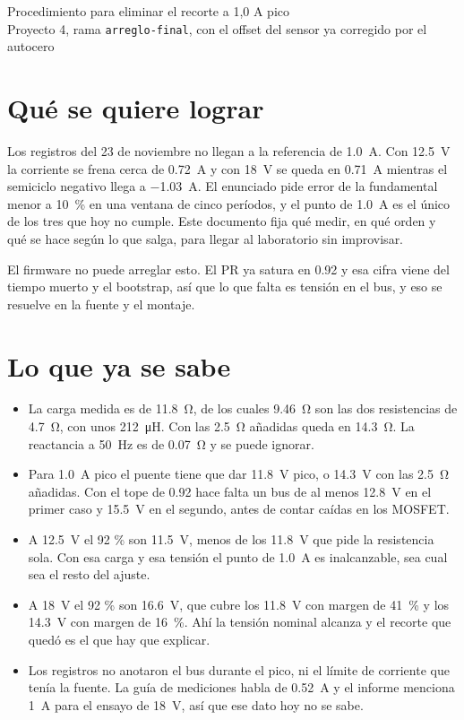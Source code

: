 \documentclass[11pt,a4paper]{article}
\begin{document}
\begin{center}
{\Large Procedimiento para eliminar el recorte a 1,0 A pico}\\[4pt]
Proyecto 4, rama \texttt{arreglo-final}, con el offset del sensor ya corregido por el autocero
\end{center}

\section{Qué se quiere lograr}

Los registros del 23 de noviembre no llegan a la referencia de \SI{1.0}{A}. Con \SI{12.5}{V} la corriente se frena cerca de \SI{+0.72}{A} y con \SI{18}{V} se queda en \SI{+0.71}{A} mientras el semiciclo negativo llega a \SI{-1.03}{A}. El enunciado pide error de la fundamental menor a \SI{10}{\percent} en una ventana de cinco períodos, y el punto de \SI{1.0}{A} es el único de los tres que hoy no cumple. Este documento fija qué medir, en qué orden y qué se hace según lo que salga, para llegar al laboratorio sin improvisar.

El firmware no puede arreglar esto. El PR ya satura en \num{0.92} y esa cifra viene del tiempo muerto y el bootstrap, así que lo que falta es tensión en el bus, y eso se resuelve en la fuente y el montaje.

\section{Lo que ya se sabe}

\begin{itemize}
\item La carga medida es de \SI{11.8}{\ohm}, de los cuales \SI{9.46}{\ohm} son las dos resistencias de \SI{4.7}{\ohm}, con unos \SI{212}{\micro H}. Con las \SI{2.5}{\ohm} añadidas queda en \SI{14.3}{\ohm}. La reactancia a \SI{50}{Hz} es de \SI{0.07}{\ohm} y se puede ignorar.
\item Para \SI{1.0}{A} pico el puente tiene que dar \SI{11.8}{V} pico, o \SI{14.3}{V} con las \SI{2.5}{\ohm} añadidas. Con el tope de \num{0.92} hace falta un bus de al menos \SI{12.8}{V} en el primer caso y \SI{15.5}{V} en el segundo, antes de contar caídas en los MOSFET.
\item A \SI{12.5}{V} el 92 \% son \SI{11.5}{V}, menos de los \SI{11.8}{V} que pide la resistencia sola. Con esa carga y esa tensión el punto de \SI{1.0}{A} es inalcanzable, sea cual sea el resto del ajuste.
\item A \SI{18}{V} el 92 \% son \SI{16.6}{V}, que cubre los \SI{11.8}{V} con margen de \SI{41}{\percent} y los \SI{14.3}{V} con margen de \SI{16}{\percent}. Ahí la tensión nominal alcanza y el recorte que quedó es el que hay que explicar.
\item Los registros no anotaron el bus durante el pico, ni el límite de corriente que tenía la fuente. La guía de mediciones habla de \SI{0.52}{A} y el informe menciona \SI{1}{A} para el ensayo de \SI{18}{V}, así que ese dato hoy no se sabe.
\end{itemize}
\end{document}
